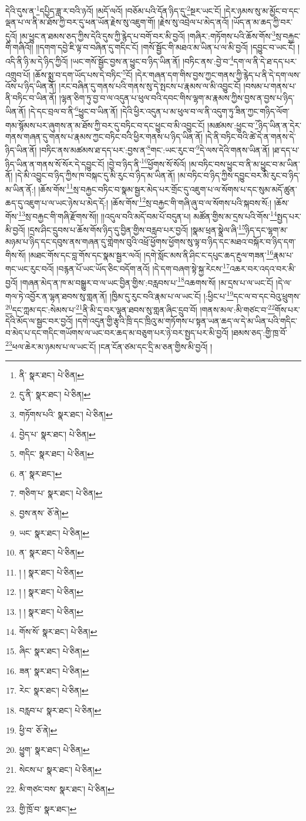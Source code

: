དེའི་དུས་ན་\footnote{ནི་  སྣར་ཐང་།  པེ་ཅིན། }དཔྱིད་ཟླ་ར་བའི་ཉའོ། །མདོ་ལའོ། །བཅོམ་པའི་དོན་ཉིད་དུ་\footnote{དུ་ནི་  སྣར་ཐང་།  པེ་ཅིན། }སྔར་ཡང་ངོ། །དེར་ཉམས་སུ་མ་མྱོང་བ་དང་ལྡན་པ་ལ་ནི་མ་ཐོས་ཀྱི་བར་དུ་ཕན་ཡོན་རྗེས་སུ་འཇུག་གོ། །རྗེས་སུ་འབྲེལ་པ་མེད་ནའོ། །ཡོད་ན་མ་ཆད་ཀྱི་བར་དུའོ། །མ་ཕྱུང་ན་ཐམས་ཅད་ཀྱིས་དེའི་དུས་ཀྱི་རྙེད་པ་བགོ་བར་མི་བྱའོ། །གཞིར་:གཏོགས་པའི་ཆོས་གོས་\footnote{གཏོགས་པའི་  སྣར་ཐང་།  པེ་ཅིན། }སྲ་བརྐྱང་གི་གཞིའོ།། །།དགག་དབྱེ་ཇི་ལྟ་བ་བཞིན་དུ་གདིང་ངོ། །གསོ་སྦྱོང་གི་མཐའ་མ་ཡིན་པ་ལ་མི་བྱའོ། །དབྱུང་བ་ཡང་ངོ། །འདི་ནི་ཉི་མ་དེ་ཉིད་ཀྱིའོ། །ཡང་གསོ་སྦྱོང་བྱས་ན་ཕྱུང་བ་ཉིད་ཡིན་ནོ། །བཏིང་ནས་:བྱེ་བ་\footnote{བྱེད་པ་  སྣར་ཐང་།  པེ་ཅིན། }དག་ལ་ནི་དེ་ཐ་དད་པར་འགྲུབ་པོ། །ཆོས་སྨྲ་བ་དག་ཡོད་པས་དེ་བཏིང་\footnote{གདིང་  སྣར་ཐང་།  པེ་ཅིན། }ངོ། །དེར་གཞན་དག་གིས་བྱས་ཀྱང་གནས་ཀྱི་རྙེད་པ་ནི་དེ་དག་ལས་འོས་པ་ཉིད་ཡིན་ནོ། །རང་བཞིན་དུ་གནས་པའི་གནས་སུ་དེ་སྤངས་པ་རྣམས་ལ་མི་འབྱུང་ངོ། །བསམ་པ་གནས་པ་ནི་བཏིང་བ་ཡིན་ནོ། །ལྷན་ཅིག་ཏུ་བྱ་བ་ལ་འདུན་པ་ཕུལ་བའི་དབང་གིས་ལྷག་མ་རྣམས་ཀྱིས་བྱས་ན་བྱས་པ་ཉིད་ཡིན་ནོ། །དེ་དང་བྲལ་བ་ནི་\footnote{ན་  སྣར་ཐང་། }ཕྱུང་བ་ཡིན་ནོ། །དེའི་ཕྱིར་འདུན་པ་མ་ཕུལ་བ་ལ་ནི་འདུག་ཏུ་ཟིན་ཀྱང་གཉིད་ལོག་གམ་སྙོམས་པར་ཞུགས་ན་མ་ཐོས་ཀྱི་བར་དུ་བཏིང་བ་དང་ཕྱུང་བ་མི་འབྱུང་ངོ། །མཚམས་:ཕྱུང་བ་\footnote{གཅིག་པ་  སྣར་ཐང་།  པེ་ཅིན། }ཉིད་ཡིན་ན་དེར་གནས་གཞན་དུ་གནས་པ་རྣམས་ཀྱང་བཏིང་བའི་ཕྱིར་གནས་པ་ཉིད་ཡིན་ནོ། །དེ་ནི་བཏིང་བའི་ཚེ་དེ་ན་གནས་དེ་ཉིད་ཡིན་ནོ། །བཏིང་ནས་མཚམས་ཐ་དད་པར་:བྱས་ན་\footnote{བྱས་ནས་  ཅོ་ནེ། }གང་:ཡང་རུང་བ་\footnote{ཡང་  སྣར་ཐང་།  པེ་ཅིན། }དེ་ལས་དེའི་གནས་ཡིན་ནོ། །ཐ་དད་པ་ཉིད་ཡིན་ན་གནས་སོ་སོར་དེ་དབྱུང་ངོ། །བྱེ་བ་ཉིད་ནི་\footnote{ན་  སྣར་ཐང་།  པེ་ཅིན། }ཕྱོགས་སོ་སོའོ། །མ་བཏིང་བས་ཕྱུང་བ་ནི་མ་ཕྱུང་བ་མ་ཡིན་ནོ། །དེ་མི་འབྱུང་བ་ཉིད་ཀྱིས་ཁ་བསྐང་དུ་མི་རུང་བ་ཉིད་མ་ཡིན་ནོ། །མ་བཏིང་བ་ཉིད་ཀྱིས་དབྱུང་བར་མི་རུང་བ་ཉིད་མ་ཡིན་ནོ:། །ཆོས་གོས་\footnote{། །  སྣར་ཐང་།  པེ་ཅིན། }སྲ་བརྐྱང་བཏིང་བ་སྣམ་སྦྱར་མེད་པར་གྲོང་དུ་འཇུག་པ་ལ་སོགས་པ་དང་སུམ་མདོ་ཚུན་ཆད་དུ་འཇུག་པ་ལ་ཡང་ཉེས་པ་མེད་དོ:། །ཆོས་གོས་\footnote{། །  སྣར་ཐང་།  པེ་ཅིན། }སྲ་བརྐྱང་གི་གཞི་ཞུ་བ་ལ་སོགས་པའི་སྐབས་སོ:། །ཆོས་གོས་\footnote{། །  སྣར་ཐང་།  པེ་ཅིན། }སྲ་བརྐྱང་གི་གཞི་རྫོགས་སོ།། །།འདུལ་བའི་མདོ་བམ་པོ་བདུན་པ། མཚོན་གྱིས་མ་དྲས་པའི་གོས་\footnote{གོས་སོ་  སྣར་ཐང་།  པེ་ཅིན། }སྤྱད་པར་མི་བྱའོ། །དྲས་ཤིང་དྲུབས་པ་ཆོས་གོས་ཉིད་དུ་བྱིན་གྱིས་བརླབ་པར་བྱའོ། །སྣམ་ཕྲན་སྣྲེལ་ཞི་\footnote{ཞིང་  སྣར་ཐང་།  པེ་ཅིན། }ཉིད་དང་ལྷག་མ་མཉམ་པ་ཉིད་དང་དབུས་ནས་གཞན་དུ་གླེགས་བུའི་འཕྲོ་ཕྱོགས་ཕྱོགས་སུ་ལྟ་བ་ཉིད་དང་མཐའ་བསྐོར་བ་ཉིད་དག་གིས་སོ། །མཐང་གོས་དང་བླ་གོས་དང་སྣམ་སྦྱར་ལའོ། །དགེ་སློང་མས་ནི་ཤིང་ང་དཔུང་ཆད་རྔུལ་གཟན་\footnote{ཟན་  སྣར་ཐང་།  པེ་ཅིན། }རྣམ་པ་གང་ཡང་རུང་བའོ། །བརྙན་པོ་ཡང་ཡོད་ཅིང་བདོག་ནའོ། །དེ་དག་བཞག་སྟེ་སྐྱ་རེངས་\footnote{རེང་  སྣར་ཐང་།  པེ་ཅིན། }འཆར་བར་འདའ་བར་མི་བྱའོ། །གཞན་མེད་ན་ཁ་མ་བསྒྱུར་བ་ལ་ཡང་བྱིན་གྱིས་:བརླབས་པ་\footnote{བརླབ་པ་  སྣར་ཐང་།  པེ་ཅིན། }འཆགས་སོ། །མ་དྲས་པ་ལ་ཡང་ངོ། །དེ་ལ་གལ་ཏེ་འབྱོར་ན་ལྷན་ཐབས་སུ་གླན་ནོ། །ཁྱིམ་དུ་རུང་བའི་རྣམ་པ་ལ་ཡང་ངོ། །:ཕྱིང་པ་\footnote{ཕྱི་བ་  ཅོ་ནེ། }དང་ལ་བ་དང་བེའུ་ཕྲུགས་\footnote{ཕྱུག་  སྣར་ཐང་།  པེ་ཅིན། }དང་ཀླམ་དང་:སེམས་པ་\footnote{སེངས་པ་  སྣར་ཐང་།  པེ་ཅིན། }ནི་མི་དྲ་བར་ལྷན་ཐབས་སུ་གླན་ཞིང་དྲུབ་བོ། །གནས་མལ་:མི་གཙང་བ་\footnote{མི་གཙང་བས་  སྣར་ཐང་།  པེ་ཅིན། }གོས་པར་དེའི་མོད་ལ་སྦྱང་བར་བྱའོ། །དགེ་འདུན་གྱི་རྩྭའི་ཁྲི་དང་ཁྲིའུ་མ་གཏོགས་པ་སྟན་ཡན་ཆད་ལ་དེ་མ་ཡིན་པའི་གདིང་བ་མེད་པ་དང་གདིང་གཡོགས་ལ་ཡང་བར་ཆད་མ་བཅུག་པར་ཉེ་བར་སྤྱད་པར་མི་བྱའོ། །ཐམས་ཅད་:གྱི་ཁྲ་བོ་\footnote{གྱི་ཁྲོ་བ་  སྣར་ཐང་། }ཕལ་ཆེར་མ་ཉམས་པ་ལ་ཡང་ངོ། །ངན་ངོན་ཙམ་དང་དྲི་མ་ཅན་གྱིས་མི་བྱའོ། །
